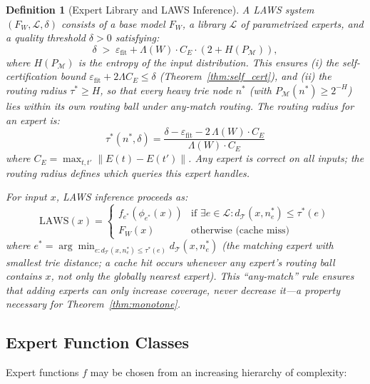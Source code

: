 \documentclass[11pt]{article}
\newtheorem{definition}{Definition}
\begin{document}
\begin{definition}[Expert Library and LAWS Inference]
\label{def:laws}
A \emph{LAWS system} $(F_W, \mathcal{L}, \delta)$ consists of a base model
$F_W$, a library $\mathcal{L}$ of parametrized experts, and a quality threshold
$\delta > 0$ satisfying:
\[
  \delta \;>\; \varepsilon_{\mathrm{fit}} + \Lambda(W) \cdot C_E \cdot (2 + H(P_{\mathcal{M}})),
\]
where $H(P_{\mathcal{M}})$ is the entropy of the input distribution.
This ensures (i) the self-certification bound $\varepsilon_{\mathrm{fit}} + 2\Lambda C_E \leq \delta$
(Theorem~\ref{thm:self_cert}), and (ii) the routing radius $\tau^* \geq H$,
so that every heavy trie node $n^*$ (with $P_{\mathcal{M}}(n^*) \geq 2^{-H}$)
lies within its own routing ball under any-match routing.
The \emph{routing radius} for an expert is:
\[
  \tau^*(n^*, \delta)
  = \frac{\delta - \varepsilon_{\mathrm{fit}} - 2\,\Lambda(W) \cdot C_E}{\Lambda(W) \cdot C_E}
\]
where $C_E = \max_{t,t'}\|E(t) - E(t')\|$.  Any expert is correct on all inputs;
the routing radius defines which queries this expert handles.

For input $x$, \emph{LAWS inference} proceeds as:
\[
  \mathrm{LAWS}(x) =
  \begin{cases}
    f_{e^*}(\phi_{e^*}(x)) & \text{if } \exists e \in \mathcal{L}: d_{\mathcal{T}}(x, n^*_e) \leq \tau^*(e) \\
    F_W(x) & \text{otherwise (cache miss)}
  \end{cases}
\]
where $e^* = \arg\min_{e: d_{\mathcal{T}}(x,n^*_e)\leq\tau^*(e)} d_{\mathcal{T}}(x, n^*_e)$
(the matching expert with smallest trie distance; a cache hit occurs whenever
\emph{any} expert's routing ball contains $x$, not only the globally nearest expert).
This ``any-match'' rule ensures that adding experts can only increase coverage,
never decrease it---a property necessary for Theorem~\ref{thm:monotone}.
\end{definition}

\subsection{Expert Function Classes}

Expert functions $f$ may be chosen from an increasing hierarchy of complexity:
\end{document}

